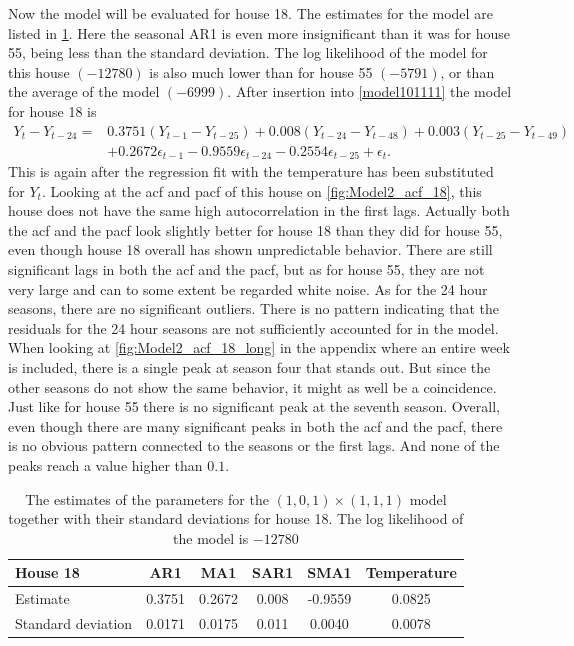 \noindent Now the model will be evaluated for house 18. The estimates for the model are listed in \cref{tab:ParamSig_House18}. Here the seasonal AR1 is even more insignificant than it was for house 55, being less than the standard deviation. The log likelihood of the model for this house $(-12780)$ is also much lower than for house 55 $(-5791)$, or than the average of the model $(-6999)$. After insertion into \cref{model101111} the model for house 18 is
\begin{align}
    Y_t-Y_{t-24} = &0.3751 (Y_{t-1}-Y_{t-25}) + 0.008 (Y_{t-24}-Y_{t-48}) + 0.003 (Y_{t-25}-Y_{t-49}) \\  &+ 0.2672 \epsilon_{t-1} - 0.9559 \epsilon_{t-24} - 0.2554 \epsilon_{t-25} + \epsilon_t. \nonumber
\end{align}
This is again after the regression fit with the temperature has been substituted for $Y_t$. Looking at the acf and pacf of this house on \cref{fig:Model2_acf_18}, this house does not have the same high autocorrelation in the first lags. Actually both the acf and the pacf look slightly better for house 18 than they did for house 55, even though house 18 overall has shown unpredictable behavior. There are still significant lags in both the acf and the pacf, but as for house 55, they are not very large and can to some extent be regarded white noise. As for the 24 hour seasons, there are no significant outliers. There is no pattern indicating that the residuals for the 24 hour seasons are not sufficiently accounted for in the model. When looking at \cref{fig:Model2_acf_18_long} in the appendix where an entire week is included, there is a single peak at season four that stands out. But since the other seasons do not show the same behavior, it might as well be a coincidence. Just like for house 55 there is no significant peak at the seventh season. Overall, even though there are many significant peaks in both the acf and the pacf, there is no obvious pattern connected to the seasons or the first lags. And none of the peaks reach a value higher than $0.1$.

 \begin{table}[]
    \centering
    \begin{tabular}{l|ccccc}
    \hline
    \textbf{House 18} & \textbf{AR1} & \textbf{MA1} & \textbf{SAR1} & \textbf{SMA1} & \textbf{Temperature} \\ \hline \hline
    Estimate           & 0.3751 & 0.2672 & 0.008 & -0.9559 & 0.0825      \\ 
    Standard deviation & 0.0171 & 0.0175 & 0.011 & 0.0040  & 0.0078      \\ \hline
    \end{tabular}
    \caption{The estimates of the parameters for the $(1,0,1)\times (1,1,1)$ model together with their standard deviations for house 18. The log likelihood of the model is $-12780$}
    \label{tab:ParamSig_House18}
    \end{table}


